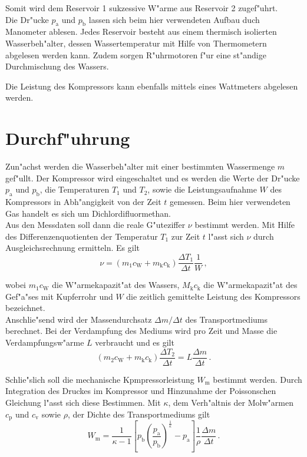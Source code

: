 	Somit wird dem Reservoir 1 sukzessive W"arme aus Reservoir 2 zugef"uhrt. \\


	Die Dr"ucke $p_\mathrm{a}$ und $p_\mathrm{b}$ lassen sich beim hier verwendeten Aufbau duch Manometer ablesen.
	Jedes Reservoir besteht aus einem thermisch isolierten Wasserbeh"alter, dessen Wassertemperatur mit Hilfe von Thermometern abgelesen werden kann.
	Zudem sorgen R"uhrmotoren f"ur eine st"andige Durchmischung des Wassers.

	Die Leistung des Kompressors kann ebenfalls mittels eines Wattmeters abgelesen werden.
	
\clearpage
\section{Durchf"uhrung}
\label{sec:durchfuehrung}
	Zun"achst werden die Wasserbeh"alter mit einer bestimmten Wassermenge $m$ gef"ullt.
	Der Kompressor wird eingeschaltet und es werden die Werte der Dr"ucke $p_\mathrm{a}$ und $p_\mathrm{b}$, die Temperaturen $T_1$ und $T_2$, sowie die Leistungsaufnahme $W$ des Kompressors in Abh"angigkeit von der Zeit $t$ gemessen.
	Beim hier verwendeten Gas handelt es sich um Dichlordifluormethan. \\

	Aus den Messdaten soll dann die reale G"uteziffer $\nu$ bestimmt werden.
	Mit Hilfe des Differenzenquotienten der Temperatur $T_1$ zur Zeit $t$ l"asst sich $\nu$ durch Ausgleichsrechnung ermitteln. Es gilt
	\begin{equation}
		\nu = (m_1 c_\mathrm{W} + m_\mathrm{k} c_\mathrm{k}) \frac{\Delta T_1}{\Delta t} \frac{1}{W} \,,
	\end{equation}

	wobei $m_1 c_\mathrm{W}$ die W"armekapazit"at des Wassers, $M_\mathrm{k} c_\mathrm{k}$ die W"armekapazit"at des Gef"a"ses mit Kupferrohr und $W$ die zeitlich gemittelte Leistung des Kompressors bezeichnet. \\

	Anschlie"send wird der Massendurchsatz $\Delta m / \Delta t$ des Transportmediums berechnet.
	Bei der Verdampfung des Mediums wird pro Zeit und Masse die Verdampfungsw"arme $L$ verbraucht und es gilt
	\begin{equation}
		(m_2 c_\mathrm{W} + m_\mathrm{k} c_\mathrm{k}) \frac{\Delta T_2}{\Delta t} = L \frac{\Delta m}{\Delta t} \,.
	\end{equation}

	Schlie"slich soll die mechanische Kpmpressorleistung $W_\mathrm{m}$ bestimmt werden.
	Durch Integration des Druckes im Kompressor und Hinzunahme der Poissonschen Gleichung l"asst sich diese Bestimmen.
	Mit $\kappa$, dem Verh"altnis der Molw"armen $c_\mathrm{p}$ und $c_\mathrm{v}$ sowie $\rho$, der Dichte des Transportmediums gilt
	\begin{equation}
		W_\mathrm{m} = \frac{1}{\kappa -1} \left[p_\mathrm{b} \left(\frac{p_\mathrm{a}}{p_\mathrm{b}}\right)^\frac{1}{\kappa} - p_\mathrm{a}\right] \frac{1}{\rho}\frac{\Delta m}{\Delta t} \,.
	\end{equation}